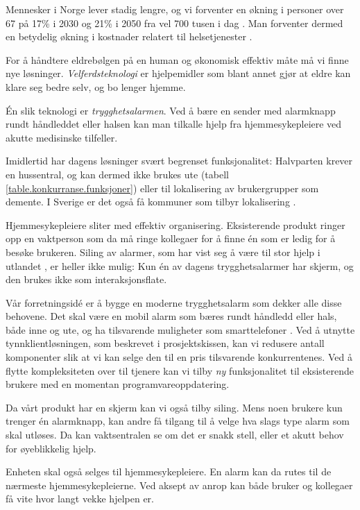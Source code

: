 Mennesker i Norge lever stadig lengre, og vi forventer en økning i personer
over 67 på 17\% i 2030 og 21\% i 2050 fra vel 700 tusen i dag
\cite{org.alarmmottak}. Man forventer dermed en betydelig økning i kostnader
relatert til helsetjenester \cite{lfh.innspill}.

For å håndtere eldrebølgen på en human og økonomisk effektiv måte må vi finne
nye løsninger. \textit{Velferdsteknologi} er hjelpemidler som blant annet gjør
at eldre kan klare seg bedre selv, og bo lenger hjemme.

Én slik teknologi er \textit{trygghetsalarmen}. Ved å bære en sender med
alarmknapp rundt håndleddet eller halsen kan man tilkalle hjelp fra
hjemmesykepleiere ved akutte medisinske tilfeller.

Imidlertid har dagens løsninger svært begrenset funksjonalitet: Halvparten
krever en hussentral, og kan dermed ikke brukes ute (tabell
\vref{table.konkurranse.funksjoner}) eller til lokalisering av brukergrupper
som demente. I Sverige er det også få kommuner som tilbyr lokalisering
\cite{sverige.alarm}.

Hjemmesykepleiere sliter med effektiv organisering. Eksisterende produkt ringer
opp en vaktperson som da må ringe kollegaer for å finne én som er ledig for å
besøke brukeren.  Siling av alarmer, som har vist seg å være til stor hjelp i
utlandet \cite{org.alarmmottak}, er heller ikke mulig: Kun én av dagens
trygghetsalarmer har skjerm, og den brukes ikke som interaksjonsflate.

Vår forretningsidé er å bygge en moderne trygghetsalarm som dekker alle disse
behovene. Det skal være en mobil alarm som bæres rundt håndledd eller hals,
både inne og ute, og ha tilsvarende muligheter som smarttelefoner
\cite{alarmparadokset}.  Ved å utnytte tynnklientløsningen, som beskrevet i
prosjektskissen, kan vi redusere antall komponenter slik at vi kan selge den til
en pris tilsvarende konkurrentenes.  Ved å flytte kompleksiteten over til
tjenere \cite{mobil.virt.fordel} kan vi tilby \textit{ny} funksjonalitet til
eksisterende brukere med en momentan programvareoppdatering.

Da vårt produkt har en skjerm kan vi også tilby siling. Mens noen brukere kun
trenger én alarmknapp, kan andre få tilgang til å velge hva slags type alarm
som skal utløses. Da kan vaktsentralen se om det er snakk stell, eller et akutt
behov for øyeblikkelig hjelp.

Enheten skal også selges til hjemmesykepleiere. En alarm kan da rutes til de
nærmeste hjemmesykepleierne. Ved aksept av anrop kan både bruker og kollegaer
få vite hvor langt vekke hjelpen er.

